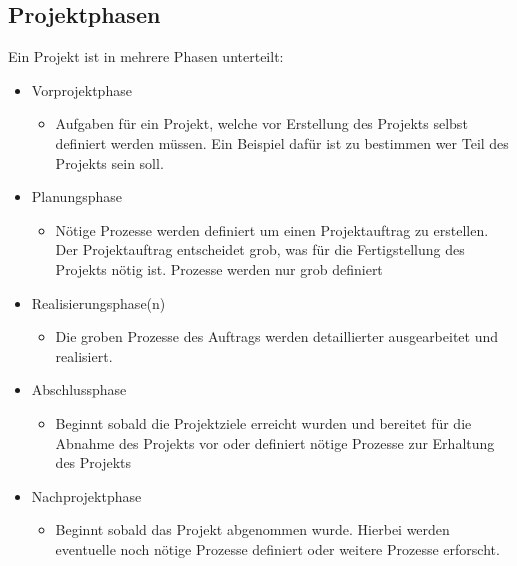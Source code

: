 \documentclass{article}
\begin{document}
	\subsection{Projektphasen}
	Ein Projekt ist in mehrere Phasen unterteilt:
	\begin{itemize}
		\item{Vorprojektphase}
		\begin{itemize}
			\item{Aufgaben für ein Projekt, welche vor Erstellung des Projekts selbst definiert werden müssen. Ein Beispiel dafür ist zu bestimmen wer Teil des Projekts sein soll.}
		\end{itemize}
		\item{Planungsphase}
		\begin{itemize}
			\item{Nötige Prozesse werden definiert um einen Projektauftrag zu erstellen. Der Projektauftrag entscheidet grob, was für die Fertigstellung des Projekts nötig ist. Prozesse werden nur grob definiert}
		\end{itemize}
		\item{Realisierungsphase(n)}
		\begin{itemize}
			\item{Die groben Prozesse des Auftrags werden detaillierter ausgearbeitet und realisiert.}
		\end{itemize}
		\item{Abschlussphase}
		\begin{itemize}
			\item{Beginnt sobald die Projektziele erreicht wurden und bereitet für die Abnahme des Projekts vor oder definiert nötige Prozesse zur Erhaltung des Projekts}
		\end{itemize}
		\item{Nachprojektphase}
		\begin{itemize}
			\item{Beginnt sobald das Projekt abgenommen wurde. Hierbei werden eventuelle noch nötige Prozesse definiert oder weitere Prozesse erforscht.}
		\end{itemize}
	\end{itemize}
\end{document}
